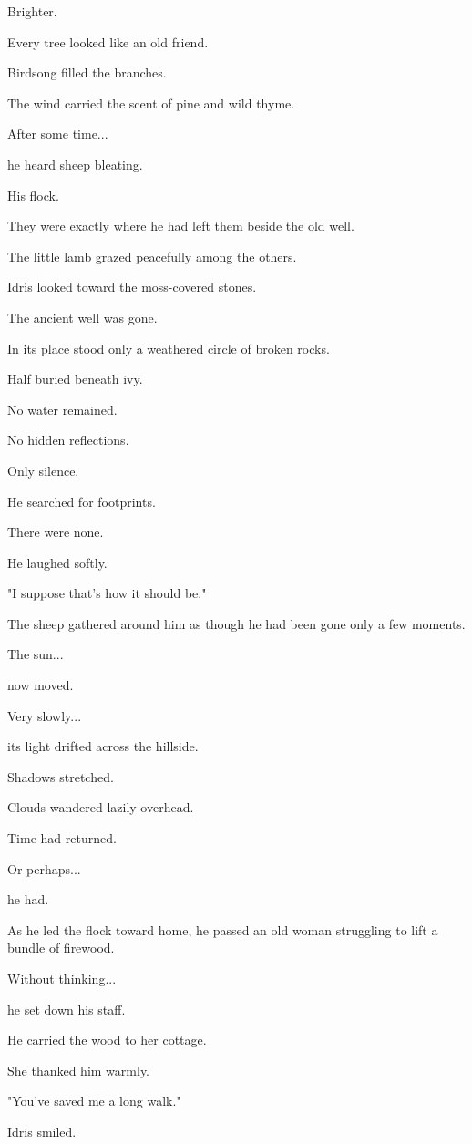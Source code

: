 \documentclass[12pt,openany]{book}
\begin{document}
Brighter.

Every tree looked like an old friend.

Birdsong filled the branches.

The wind carried the scent of pine and wild thyme.

After some time...

he heard sheep bleating.

His flock.

They were exactly where he had left them beside the old well.

The little lamb grazed peacefully among the others.

Idris looked toward the moss-covered stones.

The ancient well was gone.

In its place stood only a weathered circle of broken rocks.

Half buried beneath ivy.

No water remained.

No hidden reflections.

Only silence.

He searched for footprints.

There were none.

He laughed softly.

"I suppose that's how it should be."

The sheep gathered around him as though he had been gone only a few moments.

The sun...

now moved.

Very slowly...

its light drifted across the hillside.

Shadows stretched.

Clouds wandered lazily overhead.

Time had returned.

Or perhaps...

he had.

As he led the flock toward home, he passed an old woman struggling to lift a bundle of firewood.

Without thinking...

he set down his staff.

He carried the wood to her cottage.

She thanked him warmly.

"You've saved me a long walk."

Idris smiled.
\end{document}
